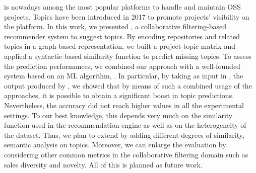 \GH is nowadays among the most popular platforms to handle and maintain OSS projects. 
Topics have been introduced in 2017 to promote projects' visibility on the 
platform. 
In this work, we presented \TF, a collaborative filtering-based recommender 
system to suggest \GH topics.  By encoding repositories and related topics in a 
graph-based representation, we built a project-topic matrix and applied a 
syntactic-based similarity function to predict missing topics.
To assess the prediction performances, we combined our approach with a well-founded system based on an ML algorithm, \ie \MNB. In particular, by taking as input in \TF, the 
output produced by \MNB, we showed that by means of such a combined usage of the approaches, it is possible to obtain a significant boost in topic predictions. 
Nevertheless, the accuracy did not reach higher values in all the experimental 
settings. To our best knowledge, this depends very much on the similarity function used in 
the recommendation engine as well as on the heterogeneity of the dataset. Thus, 
we plan to extend \TF by adding different degrees of similarity, \eg 
semantic analysis on topics. Moreover, we can enlarge the evaluation by 
considering other common metrics in the collaborative filtering domain such as 
sales diversity and novelty. All of this is planned as future work.
